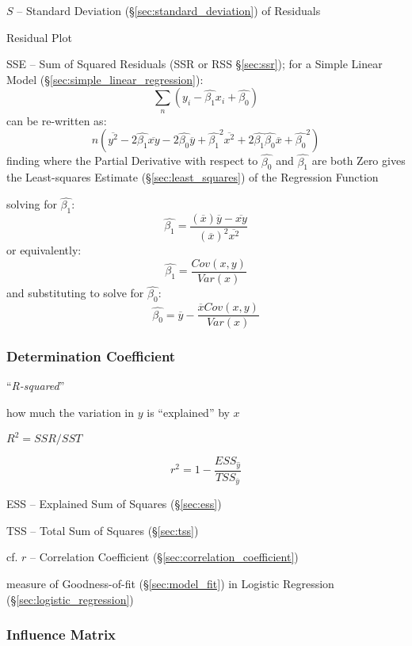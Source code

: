 $S$ -- Standard Deviation (\S\ref{sec:standard_deviation}) of Residuals

Residual Plot

SSE -- Sum of Squared Residuals (SSR or RSS \S\ref{sec:ssr}); for a Simple
Linear Model (\S\ref{sec:simple_linear_regression}):
\[
  \sum_n (y_i - \hat{\beta_1} x_i + \hat{\beta_0})
\]
can be re-written as:
\[
  n (\overline{y^2} - 2 \hat{\beta_1} \overline{x y}
    - 2 \hat{\beta_0} \overline{y} + \hat{\beta_1}^2 \overline{x^2}
    + 2 \hat{\beta_1} \hat{\beta_0} \overline{x} + \hat{\beta_0}^2)
\]
finding where the Partial Derivative with respect to $\hat{\beta_0}$ and
$\hat{\beta_1}$ are both Zero gives the Least-squares Estimate
(\S\ref{sec:least_squares}) of the Regression Function

solving for $\hat{\beta_1}$:
\[
  \hat{\beta_1} = \frac{
    (\overline{x})\overline{y} - \overline{xy}
  }{
    (\overline{x})^2 \overline{x^2}
  }
\]
or equivalently:
\[
  \hat{\beta_1} = \frac{
    Cov(x,y)
  }{
    Var(x)
  }
\]
and substituting to solve for $\hat{\beta_0}$:
\[
  \hat{\beta_0} = \overline{y} - \frac{
    \overline{x} Cov(x,y)
  }{
    Var(x)
  }
\]



\subsubsection{Determination Coefficient}\label{sec:determination_coefficient}

``\emph{R-squared}''

how much the variation in $y$ is ``explained'' by $x$

$R^2 = SSR/SST$

\[
  r^2 = 1 - \frac{
    ESS_{\hat{y}}
  }{
    TSS_{\overline{y}}
  }
\]

ESS -- Explained Sum of Squares (\S\ref{sec:ess})

TSS -- Total Sum of Squares (\S\ref{sec:tss})

cf. $r$ -- Correlation Coefficient (\S\ref{sec:correlation_coefficient})

measure of Goodness-of-fit (\S\ref{sec:model_fit}) in Logistic Regression
(\S\ref{sec:logistic_regression})



\subsubsection{Influence Matrix}\label{sec:influence_matrix}


